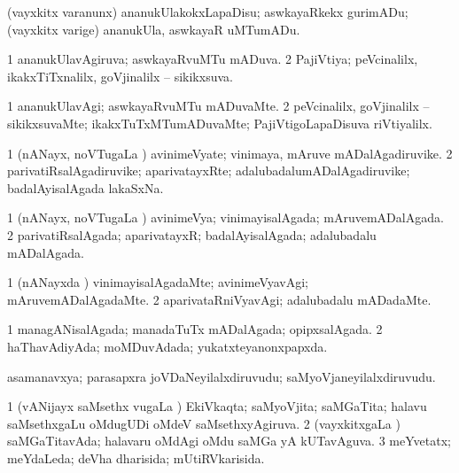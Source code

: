 \bentry
{}
\gl{\sakirx}
\bmng
(vayxkitx \mo varanunx) ananukUlakokxLapaDisu; aswkayaRkekx gurimADu; (vayxkitx \mo varige) ananukUla, aswkayaR uMTumADu. 
\emng
\eentry

\bentry
{}
\gl{\gu}
\bmng
\bnum
\num{1} ananukUlavAgiruva; aswkayaRvuMTu mADuva. 
\num{2} PajiVtiya; peVcinalilx, ikakxTiTxnalilx, goVjinalilx -- sikikxsuva. 
\enum
\emng
\eentry

\bentry
{}
\gl{\kirxvi}
\bmng
\bnum
\num{1} ananukUlavAgi; aswkayaRvuMTu mADuvaMte. 
\num{2} peVcinalilx, goVjinalilx -- sikikxsuvaMte; ikakxTuTxMTumADuvaMte; PajiVtigoLapaDisuva riVtiyalilx. 
\enum
\emng
\eentry

\bentry
{}
\gl{\nA}
\bmng
\bnum
\num{1} (nANayx, noVTugaLa \vi) avinimeVyate; vinimaya, mAruve mADalAgadiruvike. 
\num{2} parivatiRsalAgadiruvike; aparivatayxRte; adalubadalumADalAgadiruvike; badalAyisalAgada lakaSxNa. 
\enum
\emng
\eentry

\bentry
{}
\gl{\gu}
\bmng
\bnum
\num{1} (nANayx, noVTugaLa \vi) avinimeVya; vinimayisalAgada; mAruvemADalAgada. 
\num{2} parivatiRsalAgada; aparivatayxR; badalAyisalAgada; adalubadalu mADalAgada. 
\enum
\emng
\eentry

\bentry
{}
\gl{\kirxvi}
\bmng
\bnum
\num{1} (nANayxda \vi) vinimayisalAgadaMte; avinimeVyavAgi; mAruvemADalAgadaMte. 
\num{2} aparivataRniVyavAgi; adalubadalu mADadaMte. 
\enum
\emng
\eentry

\bentry
{}
\gl{\gu}
\bmng
\bnum
\num{1} managANisalAgada; manadaTuTx mADalAgada; opipxsalAgada. 
\num{2} haThavAdiyAda; moMDuvAdada; yukatxteyanonxpapxda. 
\enum
\emng
\eentry

\bentry
{}
\gl{\nA}
\bmng
asamanavxya; parasapxra joVDaNeyilalxdiruvudu; saMyoVjaneyilalxdiruvudu. 
\emng
\eentry

\bentry
{}
\gl{\gu}
\bmng
\bnum
\num{1} (vANijayx saMsethx \mo vugaLa \vi) EkiVkaqta; saMyoVjita; saMGaTita; halavu saMsethxgaLu oMdugUDi oMdeV saMsethxyAgiruva. 
\num{2} (vayxkitxgaLa \vi) saMGaTitavAda; halavaru oMdAgi oMdu saMGa yA kUTavAguva. 
\num{3} meYvetatx; meYdaLeda; deVha dharisida; mUtiRVkarisida. 
\enum
\emng
\eentry

